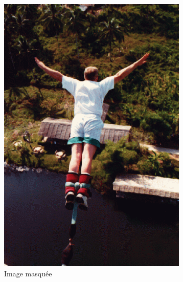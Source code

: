 \documentclass[10pt]{article}
\begin{document}
\begin{figure}[h]
    \centering
    \begin{subfigure}{0.3\textwidth}
        \centering
        \includegraphics[width=\textwidth]{images/bungee.png}
        \caption{Image masquée}
    \end{subfigure}
    \hspace{0.05\textwidth} 
    \begin{subfigure}{0.3\textwidth}
        \centering

\end{subfigure}
\end{figure}
\end{document}
